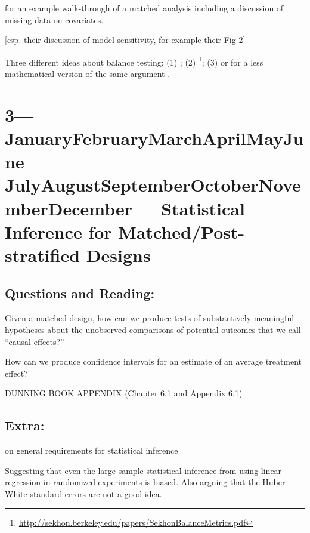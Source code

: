 \documentclass[10pt]{article}
\def\themonth{\ifcase\month\or
  January\or February\or March\or April\or May\or June\or
  July\or August\or September\or October\or November\or December\fi}
\begin{document}
\cite{hansen2011qy} for an example walk-through of a matched analysis
including a discussion of missing data on covariates.

\cite{ho2007man} [esp. their discussion of model sensitivity, for
example their Fig 2]

Three different ideas about balance testing: (1) \cite{imai2008mae}; (2)
\cite{sekhon2007alternative}\footnote{
  \url{http://sekhon.berkeley.edu/papers/SekhonBalanceMetrics.pdf}}; (3)
\cite{hansen2008cbs} \cite{hansen:statmed:2008} or for a less mathematical
version of the same argument \cite[\S 3]{bowers2011mem}.



\AdvanceDate[1]
\section{3---\themonth~\the\day---Statistical Inference for Matched/Post-stratified Designs}


\subsection{Questions and Reading:}

Given a matched design, how can we produce tests of substantively meaningful
hypotheses about the unobserved comparisons of potential outcomes that we call
``causal effects?''

\citealp[Chap 2]{rosenbaum2010design}

How can we produce  confidence intervals for an estimate of an average
treatment effect?

DUNNING BOOK APPENDIX (Chapter 6.1 and Appendix 6.1)

\citealp[Chap 17]{imbens2009causal}

\subsection{Extra:}

\citealp[Chap 4]{berk04} on general requirements for statistical
inference


\citealp{miratrix2012adjusting}

\cite{freedman2008randomization,freedman2008rae,freedman2007rae,Free:2006:On-t}
Suggesting that even the large sample statistical inference from using
linear regression in randomized experiments is biased. Also arguing
that the Huber-White standard errors are not a good idea.
\end{document}
